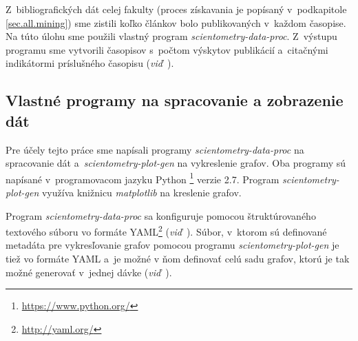 Z~bibliografických dát celej fakulty (proces získavania je popísaný
v~podkapitole \ref{sec.all.mining}) sme zistili koľko článkov bolo publikovaných
v~každom časopise.  Na túto úlohu sme použili vlastný program
\emph{scientometry-data-proc}.  Z~výstupu programu sme vytvorili časopisov
s~počtom výskytov publikácií a~citačnými indikátormi príslušného časopisu
(\emph{viď}~).

\subsection{Vlastné programy na spracovanie a zobrazenie dát}
\label{sec:program.my}

Pre účely tejto práce sme napísali programy \emph{scientometry-data-proc} na
spracovanie dát a~\emph{scientometry-plot-gen} na vykreslenie grafov.  Oba
programy sú napísané v~programovacom jazyku Python%
\footnote{\url{https://www.python.org/}} verzie 2.7.  Program
\emph{scientometry-plot-gen} využíva knižnicu \emph{matplotlib} na kreslenie
grafov.

Program \emph{scientometry-data-proc} sa konfiguruje pomocou štruktúrovaného
textového súboru vo formáte YAML\footnote{\url{http://yaml.org/}}
(\emph{viď}~).  Súbor, v~ktorom sú definované metadáta
pre vykresľovanie grafov pomocou programu \emph{scientometry-plot-gen} je tiež
vo formáte YAML a~je možné v ňom definovať celú sadu grafov, ktorú je tak možné
generovať v~jednej dávke (\emph{viď}~).


